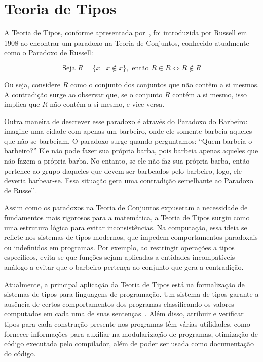 \section{Teoria de Tipos}\label{sec:type-theory}

A Teoria de Tipos, conforme apresentada por~\cite{coquand2022type}, foi introduzida por Russell em 1908 ao encontrar um paradoxo na Teoria de Conjuntos, conhecido atualmente como o Paradoxo de Russell:

\begin{equation}\nonumber
  \text{Seja } R = \{ x \mid x \notin x \}, \text{ então } R \in R \iff R \notin R
\end{equation}

Ou seja, considere $R$ como o conjunto dos conjuntos que não contêm a si mesmos.
A contradição surge ao observar que, se o conjunto $R$ contém a si mesmo, isso implica que $R$ não contém a si mesmo, e vice-versa.

Outra maneira de descrever esse paradoxo é através do Paradoxo do Barbeiro: imagine uma cidade com apenas um barbeiro, onde ele somente barbeia aqueles que não se barbeiam.
O paradoxo surge quando perguntamos: ``Quem barbeia o barbeiro?''
Ele não pode fazer sua própria barba, pois barbeia apenas aqueles que não fazem a própria barba.
No entanto, se ele não faz sua própria barba, então pertence ao grupo daqueles que devem ser barbeados pelo barbeiro, logo, ele deveria barbear-se.
Essa situação gera uma contradição semelhante ao Paradoxo de Russell.

Assim como os paradoxos na Teoria de Conjuntos expuseram a necessidade de fundamentos mais rigorosos para a matemática, a Teoria de Tipos surgiu como uma estrutura lógica para evitar inconsistências.
Na computação, essa ideia se reflete nos sistemas de tipos modernos, que impedem comportamentos paradoxais ou indefinidos em programas.
Por exemplo, ao restringir operações a tipos específicos, evita-se que funções sejam aplicadas a entidades incompatíveis — análogo a evitar que o barbeiro pertença ao conjunto que gera a contradição.

Atualmente, a principal aplicação da Teoria de Tipos está na formalização de sistemas de tipos para linguagens de programação.
Um sistema de tipos garante a ausência de certos comportamentos dos programas classificando os valores computados em cada uma de suas sentenças~\cite{pierce2002types}.
Além disso, atribuir e verificar tipos para cada construção presente nos programas têm várias utilidades, como fornecer informações para auxiliar na modularização de programas, otimização de código executada pelo compilador, além de poder ser usada como documentação do código.

